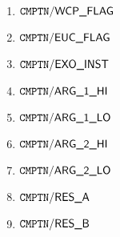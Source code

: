 \begin{enumerate}
	\item $\mxpComputationWcpFlag$
	\item $\mxpComputationEucFlag$
	\item $\mxpComputationExoInst$
	\item $\mxpComputationArgOneHi$
	\item $\mxpComputationArgOneLo$
	\item $\mxpComputationArgTwoHi$
	\item $\mxpComputationArgTwoLo$
	\item $\mxpComputationResA$
	\item $\mxpComputationResB$
\end{enumerate}
